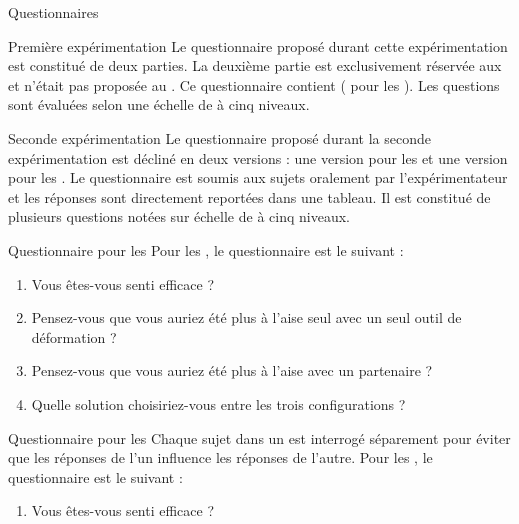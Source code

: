 \documentclass[myfrancais,ngerman,english,frenchb]{mythesis}
\begin{document}
	\begin{mychapter}{Questionnaires}
		\begin{mysection}{Première expérimentation}
			Le questionnaire proposé durant cette expérimentation est constitué de deux parties.
			La deuxième partie est exclusivement réservée aux  et n'était pas proposée au .
			Ce questionnaire contient  ( pour les ).
			Les questions sont évaluées selon une échelle de  à cinq niveaux.
		\end{mysection}
		\begin{mysection}{Seconde expérimentation}
			Le questionnaire proposé durant la seconde expérimentation est décliné en deux versions : une version pour les  et une version pour les .
			Le questionnaire est soumis aux sujets oralement par l'expérimentateur et les réponses sont directement reportées dans une tableau.
			Il est constitué de plusieurs questions notées sur échelle de  à cinq niveaux.
			\begin{mysubsection}{Questionnaire pour les }
				Pour les , le questionnaire est le suivant :
				\begin{enumerate}
					\item Vous êtes-vous senti efficace ?
					\item Pensez-vous que vous auriez été plus à l'aise seul avec un seul outil de déformation ?
					\item Pensez-vous que vous auriez été plus à l'aise avec un partenaire ?
					\item Quelle solution choisiriez-vous entre les trois configurations ?
				\end{enumerate}
			\end{mysubsection}
			\begin{mysubsection}{Questionnaire pour les }
				Chaque sujet dans un  est interrogé séparement pour éviter que les réponses de l'un influence les réponses de l'autre.
				Pour les , le questionnaire est le suivant :
				\begin{enumerate}
					\item Vous êtes-vous senti efficace ?

\end{enumerate}
\end{mysubsection}
\end{mysection}
\end{mychapter}
\end{document}
